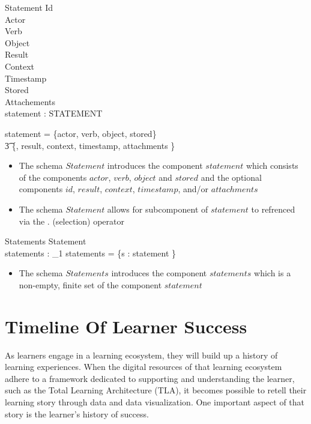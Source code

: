 \documentclass{article}
\begin{document}
\begin{schema}{Statement}
  Id \\
  Actor \\
  Verb \\
  Object \\
  Result \\
  Context \\
  Timestamp \\
  Stored \\
  Attachements \\
  statement : STATEMENT

  \where
  statement = \{actor, verb, object, stored\} \cup \\\t3 \power \{\id,
  result, context, timestamp, attachments \} \\
\end{schema}
\begin{itemize}
\item The schema $Statement$ introduces the component $statement$
  which consists of the components $actor$, $verb$, $object$ and
  $stored$ and the optional components $id$, $result$, $context$,
  $timestamp$, and/or $attachments$
\item The schema $Statement$ allows for subcomponent of $statement$
  to refrenced via the $.$ (selection) operator
\end{itemize}

\begin{schema}{Statements}
  Statement \\
  statements : \finset_1
  \where
  statements = \{s : statement \}
\end{schema}
\begin{itemize}
\item The schema $Statements$ introduces the component $statements$
  which is a non-empty, finite set of the component $statement$
\end{itemize}

\section{Timeline Of Learner Success}
As learners engage in a learning ecosystem, they will build
up a history of learning experiences. When the digital resources of that learning ecosystem
adhere to a framework dedicated to supporting and understanding the
learner, such as the Total Learning Architecture (TLA), it becomes
possible to retell their learning story through data and data visualization. One important aspect of
that story is the learner's history of success.
\end{document}
